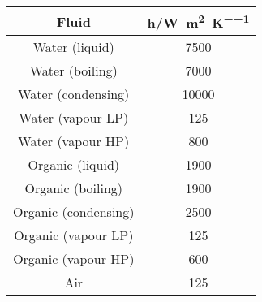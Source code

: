 \begin{tabular}{|c c |}
    \hline
    \rowcolor{bluepoli!40} %
    \textbf{Fluid} & \(\mathbf{h}\)/\unit{\watt\per\m\squared\per\K} \T\B \\
    \hline \hline
    Water (liquid) & 7500 \T\B \\
    Water (boiling)& 7000 \T\B \\
    Water (condensing)& 10000 \T\B \\
    Water (vapour LP)& 125 \T\B \\
    Water (vapour HP)& 800\T\B \\
    \hline
    Organic (liquid) & 1900 \T\B \\
    Organic (boiling)& 1900 \T\B \\
    Organic (condensing)& 2500 \T\B \\
    Organic (vapour LP)& 125 \T\B \\
    Organic (vapour HP)& 600\T\B \\
    \hline
    Air & 125 \T\B \\

    \hline
\end{tabular}